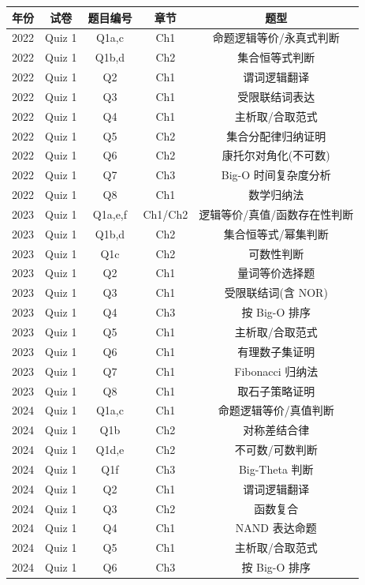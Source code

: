 \documentclass[10pt,a4paper,openany]{ctexbook}
\theoremstyle{definition}
\theoremstyle{remark}
\begin{document}
\begin{center}
\begin{tabular}{ccccc}
\hline
年份 & 试卷 & 题目编号 & 章节 & 题型 \\ \hline
2022 & Quiz 1 & Q1a,c & Ch1 & 命题逻辑等价/永真式判断 \\
2022 & Quiz 1 & Q1b,d & Ch2 & 集合恒等式判断 \\
2022 & Quiz 1 & Q2 & Ch1 & 谓词逻辑翻译 \\
2022 & Quiz 1 & Q3 & Ch1 & 受限联结词表达 \\
2022 & Quiz 1 & Q4 & Ch1 & 主析取/合取范式 \\
2022 & Quiz 1 & Q5 & Ch2 & 集合分配律归纳证明 \\
2022 & Quiz 1 & Q6 & Ch2 & 康托尔对角化(不可数) \\
2022 & Quiz 1 & Q7 & Ch3 & Big-O 时间复杂度分析 \\
2022 & Quiz 1 & Q8 & Ch1 & 数学归纳法 \\
2023 & Quiz 1 & Q1a,e,f & Ch1/Ch2 & 逻辑等价/真值/函数存在性判断 \\
2023 & Quiz 1 & Q1b,d & Ch2 & 集合恒等式/幂集判断 \\
2023 & Quiz 1 & Q1c & Ch2 & 可数性判断 \\
2023 & Quiz 1 & Q2 & Ch1 & 量词等价选择题 \\
2023 & Quiz 1 & Q3 & Ch1 & 受限联结词(含 NOR) \\
2023 & Quiz 1 & Q4 & Ch3 & 按 Big-O 排序 \\
2023 & Quiz 1 & Q5 & Ch1 & 主析取/合取范式 \\
2023 & Quiz 1 & Q6 & Ch1 & 有理数子集证明 \\
2023 & Quiz 1 & Q7 & Ch1 & Fibonacci 归纳法 \\
2023 & Quiz 1 & Q8 & Ch1 & 取石子策略证明 \\
2024 & Quiz 1 & Q1a,c & Ch1 & 命题逻辑等价/真值判断 \\
2024 & Quiz 1 & Q1b & Ch2 & 对称差结合律 \\
2024 & Quiz 1 & Q1d,e & Ch2 & 不可数/可数判断 \\
2024 & Quiz 1 & Q1f & Ch3 & Big-Theta 判断 \\
2024 & Quiz 1 & Q2 & Ch1 & 谓词逻辑翻译 \\
2024 & Quiz 1 & Q3 & Ch2 & 函数复合 \\
2024 & Quiz 1 & Q4 & Ch1 & NAND 表达命题 \\
2024 & Quiz 1 & Q5 & Ch1 & 主析取/合取范式 \\
2024 & Quiz 1 & Q6 & Ch3 & 按 Big-O 排序 \\

\end{tabular}
\end{center}
\end{document}
